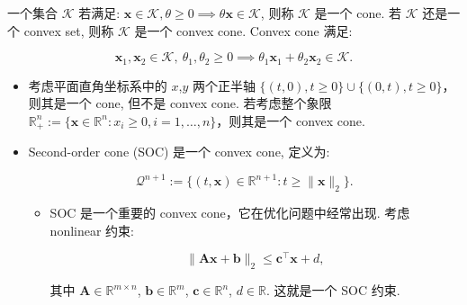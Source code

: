 \begin{defblock}
一个集合 $\mathcal{K}$ 若满足: $\bm{x} \in \mathcal{K}, \theta \geq 0 \implies \theta \bm{x} \in \mathcal{K}$, 则称 $\mathcal{K}$ 是一个 cone. 若 $\mathcal{K}$ 还是一个 convex set, 则称 $\mathcal{K}$ 是一个 convex cone. Convex cone 满足:

\[
\bm{x}_1, \bm{x}_2 \in \mathcal{K},~ \theta_1, \theta_2 \geq 0 \implies \theta_1 \bm{x}_1 + \theta_2 \bm{x}_2 \in \mathcal{K}.
\]

\end{defblock}

\begin{itemize}
\item {}考虑平面直角坐标系中的 $x$,$y$ 两个正半轴 $\{(t,0), t \geq 0\} \cup \{(0,t), t \geq 0\}$，则其是一个 cone, 但不是 convex cone. 若考虑整个象限 $\mathbb{R}_+^n := \{\bm{x} \in \mathbb{R}^n: x_i \geq 0, i=1,\ldots,n\}$，则其是一个 convex cone.


\end{itemize}


\begin{defblock}
\begin{itemize}
\item {}Second-order cone (SOC) 是一个 convex cone, 定义为:

\[
\mathcal{Q}^{n+1} := \{(t, \bm{x}) \in \mathbb{R}^{n+1}: t \geq \|\bm{x}\|_2\}.
\]

\begin{itemize}
\item {}SOC 是一个重要的 convex cone，它在优化问题中经常出现. 考虑 nonlinear 约束:

\[
\|\bm{A}\bm{x} + \bm{b}\|_2 \leq \bm{c}^\top \bm{x} + d,
\]

其中 $\bm{A} \in \mathbb{R}^{m \times n}$, $\bm{b} \in \mathbb{R}^m$, $\bm{c} \in \mathbb{R}^n$, $d \in \mathbb{R}$. 这就是一个 SOC 约束.


\end{itemize}


\end{itemize}

\end{defblock}


